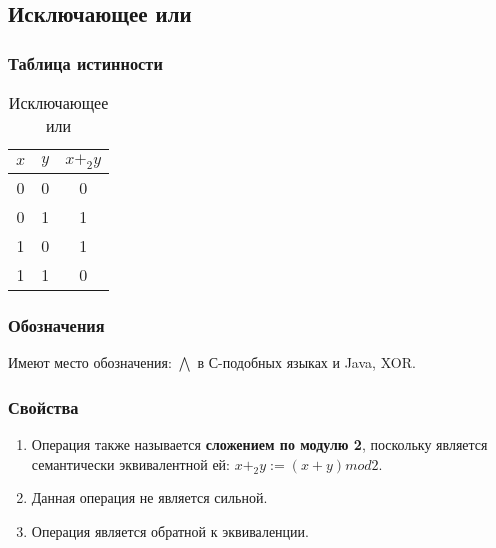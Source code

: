\subsection{Исключающее или}
\subsubsection{Таблица истинности}
\begin{table}[h]
	\begin{center}
		\begin{tabular}{|c|c|c|}
			\hline
			$x$ & $y$ & $x +_2 y$\\
			\hline
			0 & 0 & 0\\
			\hline
			0 & 1 & 1\\
			\hline
			1 & 0 & 1\\
			\hline
			1 & 1 & 0\\
			\hline
		\end{tabular}
		\caption{Исключающее или}
	\end{center}
\end{table}

\subsubsection{Обозначения}
Имеют место обозначения: $\bigwedge$ в С-подобных языках и Java, XOR.

\subsubsection{Свойства}
\begin{enumerate}
	\item Операция также называется \textbf{сложением по модулю 2}, поскольку является семантически эквивалентной ей: $x +_2 y := (x + y) mod 2$.
	\item Данная операция не является сильной.
	\item Операция является обратной к эквиваленции.
\end{enumerate}


